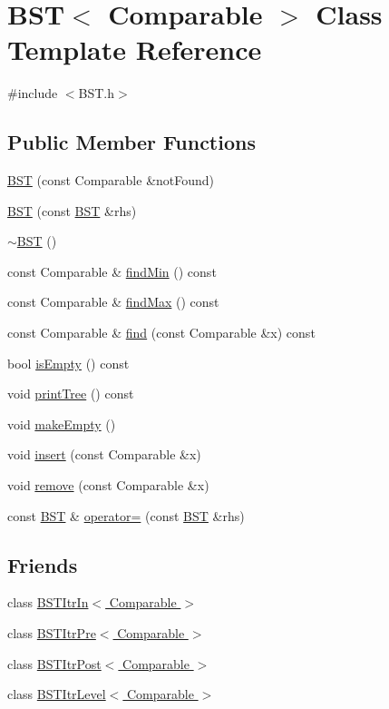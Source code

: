 \hypertarget{class_b_s_t}{
\section{BST$<$ Comparable $>$ Class Template Reference}
\label{class_b_s_t}
}


{\ttfamily \#include $<$BST.h$>$}

\subsection*{Public Member Functions}
\begin{DoxyCompactItemize}
\item 
\hyperlink{class_b_s_t_a3185a79cf472271f122a97d0f59022d1}{BST} (const Comparable \&notFound)
\item 
\hyperlink{class_b_s_t_a163232cc6ffcbd1a51707efcc3fa36ca}{BST} (const \hyperlink{class_b_s_t}{BST} \&rhs)
\item 
\hyperlink{class_b_s_t_abf3125f968641c8726101c5dd18f36be}{$\sim$BST} ()
\item 
const Comparable \& \hyperlink{class_b_s_t_a34fd17be76f49a77573185f29dede6be}{findMin} () const 
\item 
const Comparable \& \hyperlink{class_b_s_t_aee725fe273c0b3641070883b50eee271}{findMax} () const 
\item 
const Comparable \& \hyperlink{class_b_s_t_a337dce7f94a881e253635cbf3ac7eacf}{find} (const Comparable \&x) const 
\item 
bool \hyperlink{class_b_s_t_a8018fc7d6c15b2564c10ddcc4316c64d}{isEmpty} () const 
\item 
void \hyperlink{class_b_s_t_a5270473db9e17e1737b92dd0d6cd0ee5}{printTree} () const 
\item 
void \hyperlink{class_b_s_t_a050d829503a88714c4ad0773cf6d3af6}{makeEmpty} ()
\item 
void \hyperlink{class_b_s_t_a2b117df6521c7d61dac75ff2c938bae7}{insert} (const Comparable \&x)
\item 
void \hyperlink{class_b_s_t_a6f01a0b44daf82a42022b6eb4c0df7a2}{remove} (const Comparable \&x)
\item 
const \hyperlink{class_b_s_t}{BST} \& \hyperlink{class_b_s_t_aa80c39f454c89d4a202be3d1445823f3}{operator=} (const \hyperlink{class_b_s_t}{BST} \&rhs)
\end{DoxyCompactItemize}
\subsection*{Friends}
\begin{DoxyCompactItemize}
\item 
class \hyperlink{class_b_s_t_aab3993acac2ab24a0b59edb0c3acc775}{BSTItrIn$<$ Comparable $>$}
\item 
class \hyperlink{class_b_s_t_a45a55df6f11541416d4ea7684c575c1a}{BSTItrPre$<$ Comparable $>$}
\item 
class \hyperlink{class_b_s_t_a5dc153694be266f6e772659486219da7}{BSTItrPost$<$ Comparable $>$}
\item 
class \hyperlink{class_b_s_t_a26ff00bc0d87069aed877f10fd3c80a8}{BSTItrLevel$<$ Comparable $>$}
\end{DoxyCompactItemize}
